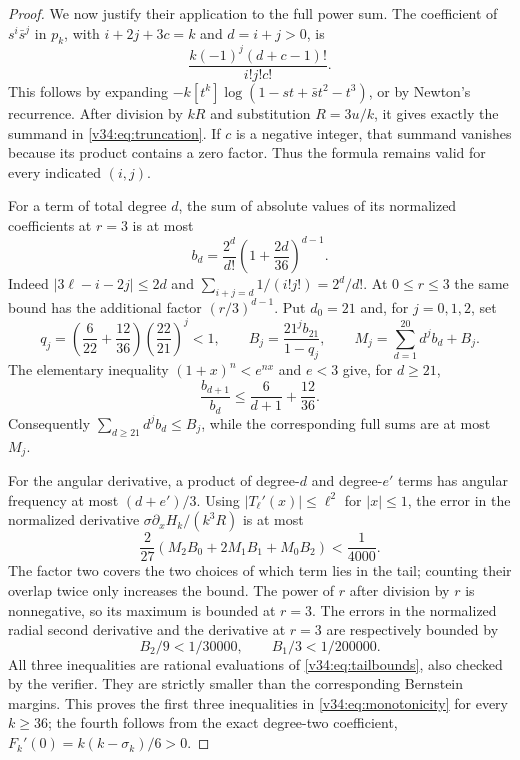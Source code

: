 \documentclass[UTF8,11pt]{ctexart}
\theoremstyle{definition}
\numberwithin{equation}{section}
\begin{document}
\begin{proof}
We now justify their application to the full power sum.
The coefficient of $s^i\bar s^j$ in $p_k$, with
$i+2j+3c=k$ and $d=i+j>0$, is
\[
             \frac{k(-1)^j(d+c-1)!}{i!j!c!}.
\]
This follows by expanding
$-k[t^k]\log(1-st+\bar st^2-t^3)$, or by Newton's recurrence.
After division by $kR$ and substitution $R=3u/k$, it gives
exactly the summand in \eqref{v34:eq:truncation}.
If $c$ is a negative integer, that summand vanishes because
its product contains a zero factor. Thus the formula remains
valid for every indicated $(i,j)$.

For a term of total degree $d$, the sum of absolute values
of its normalized coefficients at $r=3$ is at most
\[
 b_d=\frac{2^d}{d!}\left(1+\frac{2d}{36}\right)^{d-1}.
\]
Indeed $|3\ell-i-2j|\le2d$ and
$\sum_{i+j=d}1/(i!j!)=2^d/d!$. At $0\le r\le3$ the
same bound has the additional factor $(r/3)^{d-1}$.
Put $d_0=21$ and, for $j=0,1,2$, set
\begin{equation}\label{v34:eq:tailbounds}
 q_j=\left(\frac6{22}+\frac{12}{36}\right)
                \left(\frac{22}{21}\right)^j<1,\qquad
 B_j=\frac{21^j b_{21}}{1-q_j},\qquad
 M_j=\sum_{d=1}^{20}d^j b_d+B_j.
\end{equation}
The elementary inequality $(1+x)^n<e^{nx}$ and $e<3$ give,
for $d\ge21$,
\[
 \frac{b_{d+1}}{b_d}
 \le\frac6{d+1}+\frac{12}{36}.
\]
Consequently $\sum_{d\ge21}d^j b_d\le B_j$, while the
corresponding full sums are at most $M_j$.

For the angular derivative, a product of degree-$d$ and
degree-$e'$ terms has angular frequency at most $(d+e')/3$.
Using $|T_\ell'(x)|\le\ell^2$ for $|x|\le1$, the error
in the normalized derivative $\sigma\partial_xH_k/(k^3R)$
is at most
\begin{equation}\label{v34:eq:tailerrors}
 \frac2{27}(M_2B_0+2M_1B_1+M_0B_2)<\frac1{4000}.
\end{equation}
The factor two covers the two choices of which term lies
in the tail; counting their overlap twice only increases
the bound. The power of $r$ after division by $r$ is
nonnegative, so its maximum is bounded at $r=3$.
The errors in the normalized radial second derivative and
the derivative at $r=3$ are respectively bounded by
\[
                     B_2/9<1/30000,\qquad
                     B_1/3<1/200000.
\]
All three inequalities are rational evaluations of
\eqref{v34:eq:tailbounds}, also checked by the verifier.
They are strictly smaller than the corresponding Bernstein
margins. This proves the first three inequalities in
\eqref{v34:eq:monotonicity} for every $k\ge36$; the fourth
follows from the exact degree-two coefficient,
$F_k'(0)=k(k-\sigma_k)/6>0$.


\end{proof}
\end{document}
